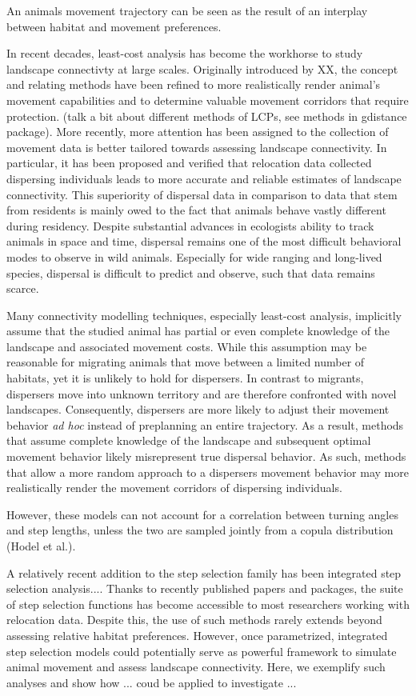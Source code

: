 \documentclass[abstract=on,10pt,a4paper,bibliography=totocnumbered]{article}
\begin{document}
An animals movement trajectory can be seen as the result of an interplay between
habitat and movement preferences.

In recent decades, least-cost analysis has become the workhorse to study
landscape connectivty at large scales. Originally introduced by XX, the concept
and relating methods have been refined to more realistically render animal's
movement capabilities and to determine valuable movement corridors that require
protection. (talk a bit about different methods of LCPs, see methods in
gdistance package). More recently, more attention has been assigned to the
collection of movement data is better tailored towards assessing landscape
connectivity. In particular, it has been proposed and verified that relocation
data collected dispersing individuals leads to more accurate and reliable
estimates of landscape connectivity. This superiority of dispersal data in
comparison to data that stem from residents is mainly owed to the fact that
animals behave vastly different during residency. Despite substantial advances
in ecologists ability to track animals in space and time, dispersal remains one
of the most difficult behavioral modes to observe in wild animals. Especially
for wide ranging and long-lived species, dispersal is difficult to predict and
observe, such that data remains scarce.

Many connectivity modelling techniques, especially least-cost analysis,
implicitly assume that the studied animal has partial or even complete knowledge
of the landscape and associated movement costs. While this assumption may be
reasonable for migrating animals that move between a limited number of habitats,
yet it is unlikely to hold for dispersers. In contrast to migrants, dispersers
move into unknown territory and are therefore confronted with novel landscapes.
Consequently, dispersers are more likely to adjust their movement behavior
\textit{ad hoc} instead of preplanning an entire trajectory. As a result,
methods that assume complete knowledge of the landscape and subsequent optimal
movement behavior likely misrepresent true dispersal behavior. As such, methods
that allow a more random approach to a dispersers movement behavior may more
realistically render the movement corridors of dispersing individuals.

However, these models can not account for a correlation between turning angles
and step lengths, unless the two are sampled jointly from a copula distribution
(Hodel et al.).

A relatively recent addition to the step selection family has been integrated
step selection analysis.... Thanks to recently published papers and packages,
the suite of step selection functions has become accessible to most researchers
working with relocation data. Despite this, the use of such methods rarely
extends beyond assessing relative habitat preferences. However, once
parametrized, integrated step selection models could potentially serve as
powerful framework to simulate animal movement and assess landscape
connectivity. Here, we exemplify such analyses and show how ... coud be applied
to investigate ...
\end{document}
